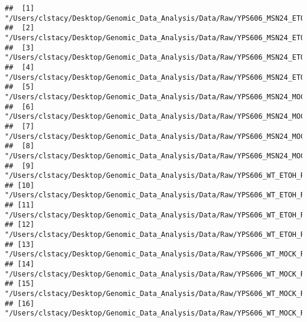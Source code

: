 \documentclass[
]{book}
\newenvironment{Shaded}{\begin{snugshade}}{\end{snugshade}}
\newcommand{\AttributeTok}[1]{\textcolor[rgb]{0.13,0.29,0.53}{#1}}
\newcommand{\CommentTok}[1]{\textcolor[rgb]{0.56,0.35,0.01}{\textit{#1}}}
\newcommand{\ConstantTok}[1]{\textcolor[rgb]{0.56,0.35,0.01}{#1}}
\newcommand{\FunctionTok}[1]{\textcolor[rgb]{0.13,0.29,0.53}{\textbf{#1}}}
\newcommand{\NormalTok}[1]{#1}
\newcommand{\OtherTok}[1]{\textcolor[rgb]{0.56,0.35,0.01}{#1}}
\newcommand{\StringTok}[1]{\textcolor[rgb]{0.31,0.60,0.02}{#1}}
\begin{document}
\begin{Shaded}
\end{Shaded}

\begin{verbatim}
##  [1] "/Users/clstacy/Desktop/Genomic_Data_Analysis/Data/Raw/YPS606_MSN24_ETOH_REP1.fastq.gz"
##  [2] "/Users/clstacy/Desktop/Genomic_Data_Analysis/Data/Raw/YPS606_MSN24_ETOH_REP2.fastq.gz"
##  [3] "/Users/clstacy/Desktop/Genomic_Data_Analysis/Data/Raw/YPS606_MSN24_ETOH_REP3.fastq.gz"
##  [4] "/Users/clstacy/Desktop/Genomic_Data_Analysis/Data/Raw/YPS606_MSN24_ETOH_REP4.fastq.gz"
##  [5] "/Users/clstacy/Desktop/Genomic_Data_Analysis/Data/Raw/YPS606_MSN24_MOCK_REP1.fastq.gz"
##  [6] "/Users/clstacy/Desktop/Genomic_Data_Analysis/Data/Raw/YPS606_MSN24_MOCK_REP2.fastq.gz"
##  [7] "/Users/clstacy/Desktop/Genomic_Data_Analysis/Data/Raw/YPS606_MSN24_MOCK_REP3.fastq.gz"
##  [8] "/Users/clstacy/Desktop/Genomic_Data_Analysis/Data/Raw/YPS606_MSN24_MOCK_REP4.fastq.gz"
##  [9] "/Users/clstacy/Desktop/Genomic_Data_Analysis/Data/Raw/YPS606_WT_ETOH_REP1.fastq.gz"   
## [10] "/Users/clstacy/Desktop/Genomic_Data_Analysis/Data/Raw/YPS606_WT_ETOH_REP2.fastq.gz"   
## [11] "/Users/clstacy/Desktop/Genomic_Data_Analysis/Data/Raw/YPS606_WT_ETOH_REP3.fastq.gz"   
## [12] "/Users/clstacy/Desktop/Genomic_Data_Analysis/Data/Raw/YPS606_WT_ETOH_REP4.fastq.gz"   
## [13] "/Users/clstacy/Desktop/Genomic_Data_Analysis/Data/Raw/YPS606_WT_MOCK_REP1.fastq.gz"   
## [14] "/Users/clstacy/Desktop/Genomic_Data_Analysis/Data/Raw/YPS606_WT_MOCK_REP2.fastq.gz"   
## [15] "/Users/clstacy/Desktop/Genomic_Data_Analysis/Data/Raw/YPS606_WT_MOCK_REP3.fastq.gz"   
## [16] "/Users/clstacy/Desktop/Genomic_Data_Analysis/Data/Raw/YPS606_WT_MOCK_REP4.fastq.gz"
\end{verbatim}
\end{document}
